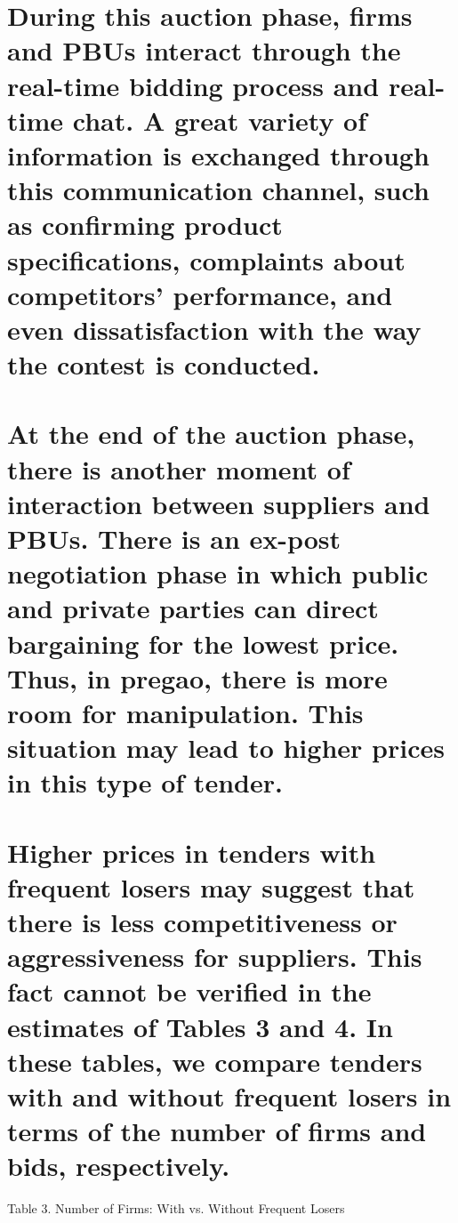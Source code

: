 \documentclass[10pt]{article}
\begin{document}
{{{{\section{During this auction phase, firms and PBUs interact through the real-time bidding process and real-time chat. A great variety of information is exchanged through this communication channel, such as confirming product specifications, complaints about competitors’ performance, and even dissatisfaction with the way the contest is conducted.}

\section{At the end of the auction phase, there is another moment of interaction between suppliers and PBUs. There is an ex-post negotiation phase in which public and private parties can direct bargaining for the lowest price. Thus, in pregao, there is more room for manipulation. This situation may lead to higher prices in this type of tender.}

\section{Higher prices in tenders with frequent losers may suggest that there is less competitiveness or aggressiveness for suppliers. This fact cannot be verified in the estimates of Tables 3 and 4. In these tables, we compare tenders with and without frequent losers in terms of the number of firms and bids, respectively.}

\vspace{1\baselineskip}
\begin{center}
Table 3. Number of Firms: With vs. Without Frequent Losers
\end{center}


}}}}
\end{document}
